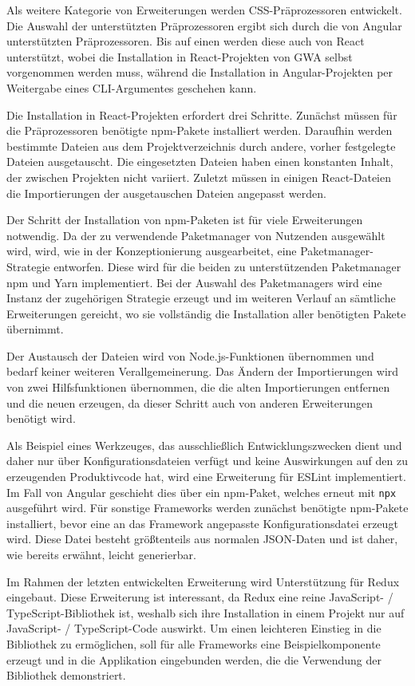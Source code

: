 Als weitere Kategorie von Erweiterungen werden CSS-Präprozessoren entwickelt. Die Auswahl der unterstützten Präprozessoren ergibt sich durch die von Angular unterstützten Präprozessoren. Bis auf einen werden diese auch von React unterstützt, wobei die Installation in React-Projekten von \gls{GWA} selbst vorgenommen werden muss, während die Installation in Angular-Projekten per Weitergabe eines \gls{CLI}-Argumentes geschehen kann.

Die Installation in React-Projekten erfordert drei Schritte. Zunächst müssen für die Präprozessoren benötigte \gls{npm}-Pakete installiert werden. Daraufhin werden bestimmte Dateien aus dem Projektverzeichnis durch andere, vorher festgelegte Dateien ausgetauscht. Die eingesetzten Dateien haben einen konstanten Inhalt, der zwischen Projekten nicht variiert. Zuletzt müssen in einigen React-Dateien die Importierungen der ausgetauschen Dateien angepasst werden.

Der Schritt der Installation von \gls{npm}-Paketen ist für viele Erweiterungen notwendig. Da der zu verwendende Paketmanager von Nutzenden ausgewählt wird, wird, wie in der Konzeptionierung ausgearbeitet, eine Paketmanager-Strategie entworfen. Diese wird für die beiden zu unterstützenden Paketmanager \gls{npm} und Yarn implementiert. Bei der Auswahl des Paketmanagers wird eine Instanz der zugehörigen Strategie erzeugt und im weiteren Verlauf an sämtliche Erweiterungen gereicht, wo sie vollständig die Installation aller benötigten Pakete übernimmt.

Der Austausch der Dateien wird von Node.js-Funktionen übernommen und bedarf keiner weiteren Verallgemeinerung. Das Ändern der Importierungen wird von zwei Hilfsfunktionen übernommen, die die alten Importierungen entfernen und die neuen erzeugen, da dieser Schritt auch von anderen Erweiterungen benötigt wird.

Als Beispiel eines Werkzeuges, das ausschließlich Entwicklungszwecken dient und daher nur über Konfigurationsdateien verfügt und keine Auswirkungen auf den zu erzeugenden Produktivcode hat, wird eine Erweiterung für ESLint implementiert. Im Fall von Angular geschieht dies über ein \gls{npm}-Paket, welches erneut mit \verb/npx/ ausgeführt wird. Für sonstige Frameworks werden zunächst benötigte \gls{npm}-Pakete installiert, bevor eine an das Framework angepasste Konfigurationsdatei erzeugt wird. Diese Datei besteht größtenteils aus normalen \gls{JSON}-Daten und ist daher, wie bereits erwähnt, leicht generierbar.

Im Rahmen der letzten entwickelten Erweiterung wird Unterstützung für Redux eingebaut. Diese Erweiterung ist interessant, da Redux eine reine JavaScript- / TypeScript-Bibliothek ist, weshalb sich ihre Installation in einem Projekt nur auf JavaScript- / TypeScript-Code auswirkt. Um einen leichteren Einstieg in die Bibliothek zu ermöglichen, soll für alle Frameworks eine Beispielkomponente erzeugt und in die Applikation eingebunden werden, die die Verwendung der Bibliothek demonstriert.

